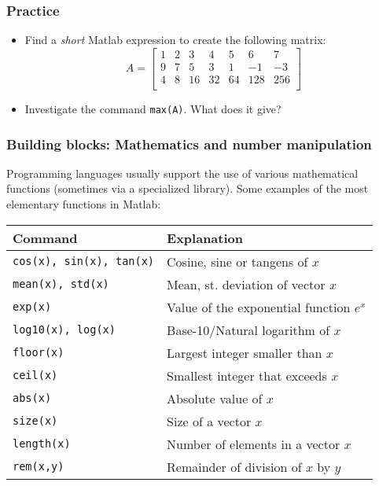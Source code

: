 \begin{frame}[fragile]
 \frametitle{Practice}
 \begin{itemize}
  \item Find a \emph{short} Matlab expression to create the following matrix:
  \[
   A = \begin{bmatrix}
        1 & 2 & 3 & 4 & 5 & 6 & 7\\
        9 & 7 & 5 & 3 & 1 & -1 & -3 \\
        4 & 8 & 16 & 32 & 64 & 128 & 256 \\
       \end{bmatrix}
  \]\pause
  \item Investigate the command \lstinline$max(A)$. What does it give?
 \end{itemize}
\end{frame}

\begin{frame}
 \frametitle{Building blocks: Mathematics and number manipulation}
 Programming languages usually support the use of various mathematical functions (sometimes via a specialized library). Some examples of the most elementary functions in Matlab:
    \begin{longtable}{l!{\vrule}l}
      Command        & Explanation \\ \hline
      \texttt{cos(x), sin(x), tan(x)} & Cosine, sine or tangens of $x$ \\
      \texttt{mean(x), std(x)} & Mean, st. deviation of vector $x$ \\
      \texttt{exp(x)} & Value of the exponential function $e^x$ \\
      \texttt{log10(x), log(x)} & Base-10/Natural logarithm of $x$ \\
      \texttt{floor(x)} & Largest integer smaller than $x$ \\
      \texttt{ceil(x)} & Smallest integer that exceeds $x$ \\
      \texttt{abs(x)} & Absolute value of $x$ \\
      \texttt{size(x)} & Size of a vector $x$ \\
      \texttt{length(x)} & Number of elements in a vector $x$ \\
      \texttt{rem(x,y)} & Remainder of division of $x$ by $y$\\
    \end{longtable}
\end{frame}

